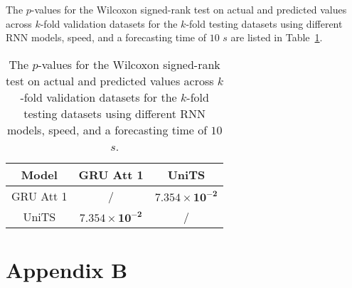 The $p$-values for the Wilcoxon signed-rank test on actual and predicted values across $k$-fold validation datasets for the $k$-fold testing datasets using different RNN models, speed, and a forecasting time of $10$ $s$ are listed in Table~\ref{tab:speed:p:10}.

\begin{table}[!ht]
	\centering
	\begin{tabular}{|c|c|c|}
		\hline
		Model & GRU Att 1 & UniTS \\ \hline
		GRU Att 1 & / & $\mathbf{7.354 \times 10^{-2}}$ \\ \hline
		UniTS & $\mathbf{7.354 \times 10^{-2}}$ & / \\ \hline
	\end{tabular}
	\caption{The $p$-values for the Wilcoxon signed-rank test on actual and predicted values across $k$-fold validation datasets for the $k$-fold testing datasets using different RNN models, speed, and a forecasting time of $10$ $s$.}
	\label{tab:speed:p:10}
\end{table}

\appendix
\section{Appendix B}
\label{appB}

